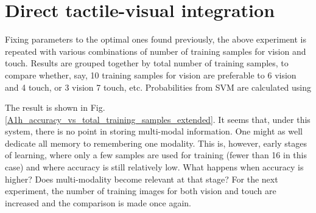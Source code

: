 \documentclass[]{article}
\begin{document}
\section{Direct tactile-visual integration}
Fixing parameters to the optimal ones found previously, the above experiment is repeated with various combinations of number of training samples for vision and touch. Results are grouped together by total number of training samples, to compare whether, say, 10 training samples for vision are preferable to 6 vision and 4 touch, or 3 vision 7 touch, etc. 
Probabilities from SVM are calculated using 

The result is shown in Fig. \ref{A1h_accuracy_vs_total_training_samples_extended}. It seems that, under this system, there is no point in storing multi-modal information. One might as well dedicate all memory to remembering one modality. This is, however, early stages of learning, where only a few samples are used for training (fewer than 16 in this case) and where accuracy is still relatively low. What happens when accuracy is higher? Does multi-modality become relevant at that stage? For the next experiment, the number of training images for both vision and touch are increased and the comparison is made once again.
\begin{figure}
	\centering
	\end{figure}
\end{document}
